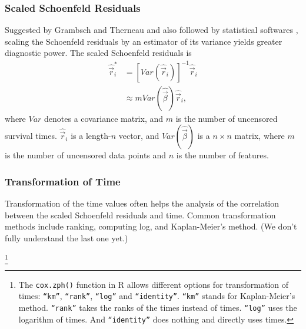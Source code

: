\subsubsection{Scaled Schoenfeld Residuals}\label{cox:scaled-residual}
Suggested by Grambsch and Therneau \cite{grambsch1994proportional} and also
followed by statistical softwares \cite{testph}, scaling the Schoenfeld
residuals by an estimator of its variance yields greater diagnostic power. The
scaled Schoenfeld residuals is
\begin{eqnarray}
\hat{\vec{r}}^{*}_i &= [\mathit{Var}(\hat{\vec{r}}_i)]^{-1} \hat{\vec{r}}_i\\
&\approx m \mathit{Var}(\hat{\vec{\beta}}) \hat{\vec{r}}_i  ,
\end{eqnarray}
where $\mathit{Var}$ denotes a covariance matrix, and $m$ is the
number of uncensored survival times. $\hat{\vec{r}}_i$ is a length-$n$
vector, and $\mathit{Var}(\hat{\vec{\beta}})$ is a $n\times n$
matrix, where $m$ is the number of uncensored data points and $n$ is
the number of features.

\subsubsection{Transformation of Time}\label{cox:transform}
Transformation of the time values often helps the analysis of the correlation
between the scaled Schoenfeld residuals and time. Common transformation methods
include ranking, computing log, and Kaplan-Meier's method. (We don't fully
understand the last one yet.)

\footnote{The \texttt{cox.zph()} function in R allows different options for
transformation of times: \texttt{``km''}, \texttt{``rank''},
\texttt{``log''} and \texttt{``identity''}.
\texttt{``km''} stands for Kaplan-Meier's method.
\texttt{``rank''} takes the ranks of the times instead of times.
\texttt{``log''} uses the logarithm of times.
And \texttt{``identity''} does nothing and directly uses times.\cite{coxzph}}



